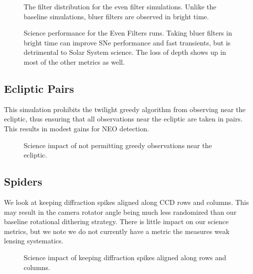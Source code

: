\begin{figure}
\label{fig:even_filt_hourglass}
\caption{The filter distribution for the even filter simulations. Unlike the baseline simulations, bluer filters are observed in bright time.}
\end{figure}



\begin{figure}
\caption{Science performance for the Even Filters runs.  Taking bluer filters in bright time can improve SNe performance and fast transients, but is detrimental to Solar System science.  The loss of depth shows up in most of the other metrics as well.}\label{fig:even_filt_radar}
\end{figure}


\subsection{Ecliptic Pairs}

This simulation prohibits the twilight greedy algorithm from observing near the ecliptic, thus ensuring that all observations near the ecliptic are taken in pairs. This results in modest gains for NEO detection. 


\begin{figure}
\caption{Science impact of not permitting greedy observations near the ecliptic. }
\end{figure}


\subsection{Spiders}

We look at keeping diffraction spikes aligned along CCD rows and columns. This may result in the camera rotator angle being much less randomized than our baseline rotational dithering strategy. There is little impact on our science metrics, but we note we do not currently have a metric the measures weak lensing systematics.

\begin{figure}
\caption{Science impact of keeping diffraction spikes aligned along rows and columns. }
\end{figure}


